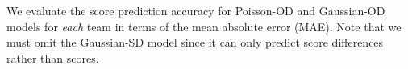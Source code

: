 \documentclass[runningheads,a4paper]{llncs}
\begin{document}




We evaluate the score prediction accuracy for Poisson-OD and
Gaussian-OD models for \emph{each} team in terms of the mean absolute
error (MAE). Note that we must omit the Gaussian-SD model since it can only
predict score differences rather than scores.

\end{document}
